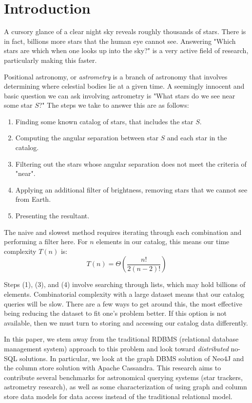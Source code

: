 \section{Introduction}\label{sec:introduction}
A cursory glance of a clear night sky reveals roughly thousands of stars.
There is in fact, billions more stars that the human eye cannot see.
Answering "Which stars are which when one looks up into the sky?" is a very active field of research, particularly
making this faster.

Positional astronomy, or \textit{astrometry} is a branch of astronomy that involves determining where celestial
bodies lie at a given time.
A seemingly innocent and basic question we can ask involving astrometry is "What stars do we see near some star $S$?"
The steps we take to answer this are as follows:
\begin{enumerate}
    \item Finding some known catalog of stars, that includes the star $S$.
    \item Computing the angular separation between star $S$ and each star in the catalog.
    \item Filtering out the stars whose angular separation does not meet the criteria of "near".
    \item Applying an additional filter of brightness, removing stars that we cannot see from Earth.
    \item Presenting the resultant.
\end{enumerate}

The naive and slowest method requires iterating through each combination and performing a filter here.
For $n$ elements in our catalog, this means our time complexity $T(n)$ is:
\begin{equation}\label{eq:nearbyProblemComplexity}
    T(n) = \Theta\left(\frac{n!}{2(n-2)!}\right)
\end{equation}

Steps (1), (3), and (4) involve searching through lists, which may hold billions of elements.
Combinatorial complexity with a large dataset means that our catalog queries will be slow.
There are a few ways to get around this, the most effective being reducing the dataset to fit one's problem better.
If this option is not available, then we must turn to storing and accessing our catalog data differently.

In this paper, we stem away from the traditional RDBMS (relational database management system) approach to this
problem and look toward \textit{distributed} no-SQL solutions.
In particular, we look at the graph DBMS solution of Neo4J and the column store solution with Apache Cassandra.
This research aims to contribute several benchmarks for astronomical querying systems (star trackers, astrometry
research), as well as some characterization of using graph and column store data models for data access instead of
the traditional relational model.